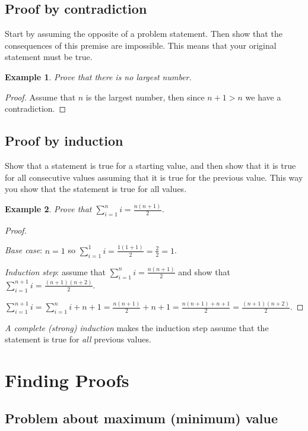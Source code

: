 \documentclass[11pt]{article}
\newtheorem{theorem}{Example}
\begin{document}
\subsection{Proof by contradiction}

Start by assuming the opposite of a problem statement. Then show that the consequences of this premise are impossible. This means that your original statement must be true.

\begin{theorem}
  Prove that there is no largest number.  
\end{theorem}
\begin{proof}
  Assume that $n$ is the largest number, then since $n + 1 > n$ we have a contradiction.
\end{proof}

\subsection{Proof by induction}

Show that a statement is true for a starting value, and then show that it is true for all consecutive values assuming that it is true for the previous value. This way you show that the statement is true for all values.

\begin{theorem}
  Prove that $\sum_{i=1}^n i = \frac{n(n+1)}{2}$.
\end{theorem}
\begin{proof}\ 

  \emph{Base case}: $n = 1$ so $\sum_{i=1}^1 i = \frac{1(1+1)}{2} = \frac{2}{2} = 1$.

  \emph{Induction step}: assume that $\sum_{i=1}^n i = \frac{n(n+1)}{2}$ and show that $\sum_{i=1}^{n+1} i = \frac{(n+1)(n+2)}{2}$.
  
  $\sum_{i=1}^{n+1} i = \sum_{i=1}^n i + n + 1 = \frac{n(n+1)}{2} + n + 1 = \frac{n(n+1) + n + 1}{2} = \frac{(n+1)(n+2)}{2}.$  
\end{proof}

\emph{A complete (strong) induction} makes the induction step assume that the statement is true for \emph{all} previous values.

\section{Finding Proofs}

\subsection{Problem about maximum (minimum) value}
\end{document}
